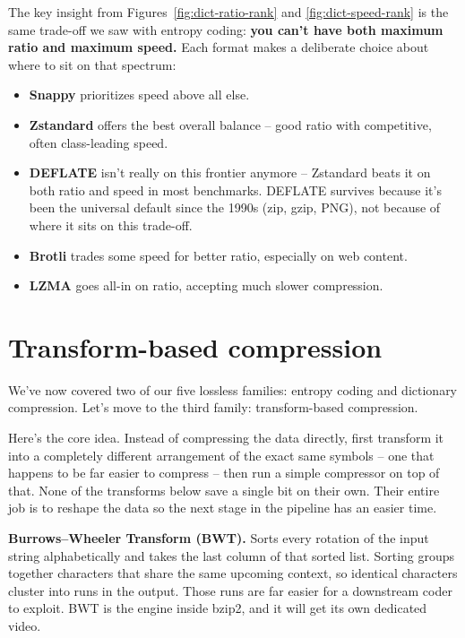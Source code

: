 \documentclass[11pt]{article}
\begin{document}
The key insight from Figures~\ref{fig:dict-ratio-rank} and
\ref{fig:dict-speed-rank} is the same trade-off we saw with entropy coding:
\textbf{you can't have both maximum ratio and maximum speed.} Each format
makes a deliberate choice about where to sit on that spectrum:

\begin{itemize}
\item \textbf{Snappy} prioritizes speed above all else.
\item \textbf{Zstandard} offers the best overall balance -- good ratio with
competitive, often class-leading speed.
\item \textbf{DEFLATE} isn't really on this frontier anymore -- Zstandard
beats it on both ratio and speed in most benchmarks. DEFLATE survives
because it's been the universal default since the 1990s (zip, gzip, PNG),
not because of where it sits on this trade-off.
\item \textbf{Brotli} trades some speed for better ratio, especially on
web content.
\item \textbf{LZMA} goes all-in on ratio, accepting much slower compression.
\end{itemize}




\section{Transform-based compression}
\label{sec:transform-bwt}

We've now covered two of our five lossless families: entropy coding and
dictionary compression. Let's move to the third family: transform-based
compression.

Here's the core idea. Instead of compressing the data directly, first
transform it into a completely different arrangement of the exact same
symbols -- one that happens to be far easier to compress -- then run a
simple compressor on top of that. None of the transforms below save a
single bit on their own. Their entire job is to reshape the data so the
next stage in the pipeline has an easier time.

\textbf{Burrows--Wheeler Transform (BWT).} Sorts every rotation of the
input string alphabetically and takes the last column of that sorted
list. Sorting groups together characters that share the same upcoming
context, so identical characters cluster into runs in the output. Those
runs are far easier for a downstream coder to exploit. BWT is the engine
inside bzip2, and it will get its own dedicated video.
\end{document}
